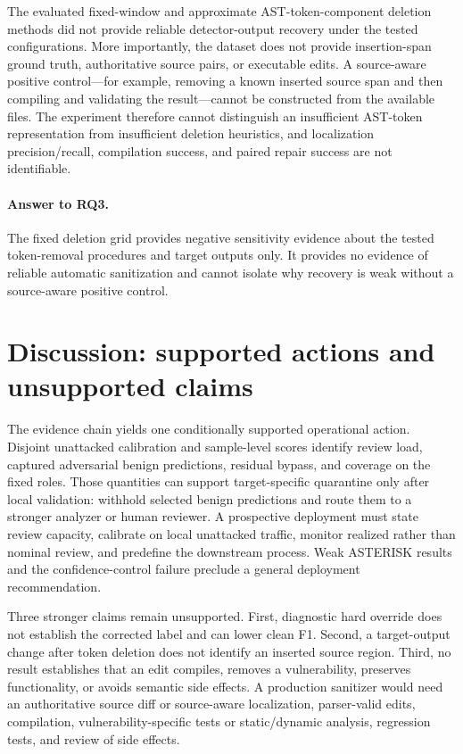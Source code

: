 \documentclass[a4paper,fleqn]{cas-dc}
\newcommand{\dataset}[1]{\textsc{#1}}
\begin{document}

The evaluated fixed-window and approximate AST-token-component deletion methods did not provide reliable detector-output recovery under the tested configurations. More importantly, the dataset does not provide insertion-span ground truth, authoritative source pairs, or executable edits. A source-aware positive control---for example, removing a known inserted source span and then compiling and validating the result---cannot be constructed from the available files. The experiment therefore cannot distinguish an insufficient AST-token representation from insufficient deletion heuristics, and localization precision/recall, compilation success, and paired repair success are not identifiable.

\paragraph{Answer to RQ3.} The fixed deletion grid provides negative sensitivity evidence about the tested token-removal procedures and target outputs only. It provides no evidence of reliable automatic sanitization and cannot isolate why recovery is weak without a source-aware positive control.

\section{Discussion: supported actions and unsupported claims}\label{sec:deployment}

The evidence chain yields one conditionally supported operational action. Disjoint unattacked calibration and sample-level scores identify review load, captured adversarial benign predictions, residual bypass, and coverage on the fixed roles. Those quantities can support target-specific quarantine only after local validation: withhold selected benign predictions and route them to a stronger analyzer or human reviewer. A prospective deployment must state review capacity, calibrate on local unattacked traffic, monitor realized rather than nominal review, and predefine the downstream process. Weak \dataset{ASTERISK} results and the confidence-control failure preclude a general deployment recommendation.

Three stronger claims remain unsupported. First, diagnostic hard override does not establish the corrected label and can lower clean F1. Second, a target-output change after token deletion does not identify an inserted source region. Third, no result establishes that an edit compiles, removes a vulnerability, preserves functionality, or avoids semantic side effects. A production sanitizer would need an authoritative source diff or source-aware localization, parser-valid edits, compilation, vulnerability-specific tests or static/dynamic analysis, regression tests, and review of side effects.
\end{document}
